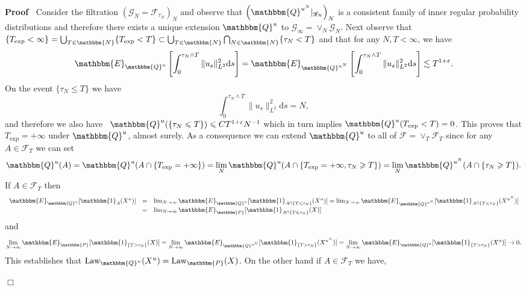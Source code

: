 \documentclass[11pt]{article}
\newcommand{\mathd}{\mathrm{d}}
\newcommand{\nobracket}{}
\newcommand{\tmop}[1]{\ensuremath{\operatorname{#1}}}
\newenvironment{proof}{\noindent\textbf{Proof\ }}{\hspace*{\fill}$\Box$\medskip}
\newcommand{\CF}{\mathscr{F}}
\newcommand{\CG}{\mathscr{G}}
\begin{document}
\begin{proof}
  Consider the filtration $\left( \CG_N = \CF_{\tau_N} \right)_N$ and observe
  that $\left( \nobracket \mathbbm{Q}^{u^N} |_{\CG_N} \right)_N$ is a
  consistent family of inner regular probability distributions and therefore
  there exists a unique extension $\mathbbm{Q}^u$ to $\CG_{\infty} = \vee_N
  \CG_N$. Next observe that $\{ T_{\exp} < \infty \} = \bigcup_{T \in
  \mathbbm{N}} \{ T_{\exp} < T \} \subset \bigcup_{T \in \mathbbm{N}}
  \bigcap_{N \in \mathbbm{N}} \{ \tau_N < T \}$ and that for any $N, T <
  \infty$, we have
  \[ \mathbbm{E}_{\mathbbm{Q}^u} \left[ \int^{\tau_N \wedge T}_0 \| u_s
     \|^2_{L^2} \mathd s \right] =\mathbbm{E}_{\mathbbm{Q}^{u^N}} \left[
     \int^{\tau_N \wedge T}_0 \| u_s \|^2_{L^2} \mathd s \right] \lesssim T^{1
     + \varepsilon} . \]
  On the event $\{ \tau_N \leqslant T \}$ we have
  \[ \int^{\tau_N \wedge T}_0 \| u_s \|^2_{L^2} \mathd s = N, \]
  and therefore we also have \ $\mathbbm{Q}^u (\{ \tau_N \leqslant T \})
  \leqslant C T^{1 + \varepsilon} N^{- 1}$ which in turn implies
  $\mathbbm{Q}^u (T_{\exp} < T) = 0$. This proves that $T_{\exp} = + \infty$
  under $\mathbbm{Q}^u$, almost surely. As a consequence we can extend
  $\mathbbm{Q}^u$ to all of $\CF = \vee_T \CF_T$ since for any $A \in \CF_T$
  we can set
  \[ \mathbbm{Q}^u (A) =\mathbbm{Q}^u (A \cap \{ T_{\exp} = + \infty \}) =
     \lim_N \mathbbm{Q}^u (A \cap \{ T_{\exp} = + \infty, \tau_N \geqslant T
     \}) = \lim_N \mathbbm{Q}^{u^N} (A \cap \{ \tau_N \geqslant T \}) . \]
  If $A \in \CF_T$ then
  \[ \begin{array}{lll}
       \mathbbm{E}_{\mathbbm{Q}^u} [\mathbbm{1}_A (X^u)] & = & \lim_{N
       \rightarrow \infty} \mathbbm{E}_{\mathbbm{Q}^u} [\mathbbm{1}_{A \cap \{
       T \leqslant \tau_N \}} (X^u)] = \lim_{N \rightarrow \infty}
       \mathbbm{E}_{\mathbbm{Q}^{u^N}} [\mathbbm{1}_{A \cap \{ T \leqslant
       \tau_N \}} (X^{u^N})]\\
       & = & \lim_{N \rightarrow \infty} \mathbbm{E}_{\mathbbm{P}}
       [\mathbbm{1}_{A \cap \{ T \leqslant \tau_N \}} (X)]
     \end{array} \]
  and
  \[ \lim_{N \rightarrow \infty} \mathbbm{E}_{\mathbbm{P}} [\mathbbm{1}_{\{ T
     > \tau_N \}} (X)] = \lim_{N \rightarrow \infty}
     \mathbbm{E}_{\mathbbm{Q}^{u^N}} [\mathbbm{1}_{\{ T > \tau_N \}}
     (X^{u^N})] = \lim_{N \rightarrow \infty} \mathbbm{E}_{\mathbbm{Q}^u}
     [\mathbbm{1}_{\{ T > \tau_N \}} (X^u)] \rightarrow 0. \]
  This establishes that $\tmop{Law}_{\mathbbm{Q}^u} (X^u) =
  \tmop{Law}_{\mathbbm{P}} (X)$. On the other hand if $A \in \CF_T$ we have,

\end{proof}
\end{document}
